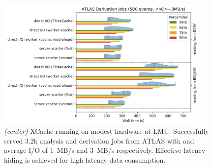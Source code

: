 \begin{figure}[h]
  \centering
  \includegraphics[height=6.5cm]{lmu-xcache.png}
  \caption{{\em (center)} XCache running on modest hardware at LMU. Successfully served 3.2k analysis and derivation jobs from ATLAS with and average I/O of 1~MB/s and 3~MB/s respectively. Effective latency hiding is achieved for high latency data consumption.}
  \label{lmu-xcache}
\end{figure}




